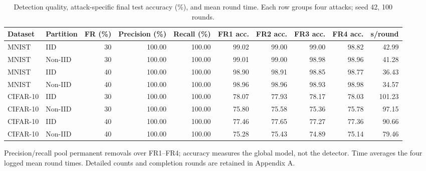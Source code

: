 \begin{table}[t]
\centering\footnotesize\setlength{\tabcolsep}{4pt}
\caption{Detection quality, attack-specific final test accuracy (\%), and mean round time. Each row groups four attacks; seed 42, 100 rounds.}\label{tab:performance}
\begin{tabular}{llrrrrrrrr}
\toprule
Dataset & Partition & FR (\%) & Precision (\%) & Recall (\%) & FR1 acc. & FR2 acc. & FR3 acc. & FR4 acc. & s/round \\
\midrule
MNIST & IID & 30 & 100.00 & 100.00 & 99.02 & 99.00 & 99.00 & 98.82 & 42.99 \\
MNIST & Non-IID & 30 & 100.00 & 100.00 & 99.01 & 99.00 & 98.98 & 98.96 & 41.28 \\
MNIST & IID & 40 & 100.00 & 100.00 & 98.90 & 98.91 & 98.85 & 98.77 & 36.43 \\
MNIST & Non-IID & 40 & 100.00 & 100.00 & 98.96 & 98.96 & 98.93 & 98.98 & 34.57 \\
CIFAR-10 & IID & 30 & 100.00 & 100.00 & 78.07 & 77.93 & 78.17 & 78.03 & 101.23 \\
CIFAR-10 & Non-IID & 30 & 100.00 & 100.00 & 75.80 & 75.58 & 75.36 & 75.78 & 97.15 \\
CIFAR-10 & IID & 40 & 100.00 & 100.00 & 77.46 & 77.65 & 77.27 & 77.36 & 90.66 \\
CIFAR-10 & Non-IID & 40 & 100.00 & 100.00 & 75.28 & 75.43 & 74.89 & 75.14 & 79.46 \\
\bottomrule
\end{tabular}
\par\smallskip\begin{minipage}{0.96\textwidth}\scriptsize Precision/recall pool permanent removals over FR1--FR4; accuracy measures the global model, not the detector. Time averages the four logged mean round times. Detailed counts and completion rounds are retained in Appendix A.\end{minipage}
\end{table}
